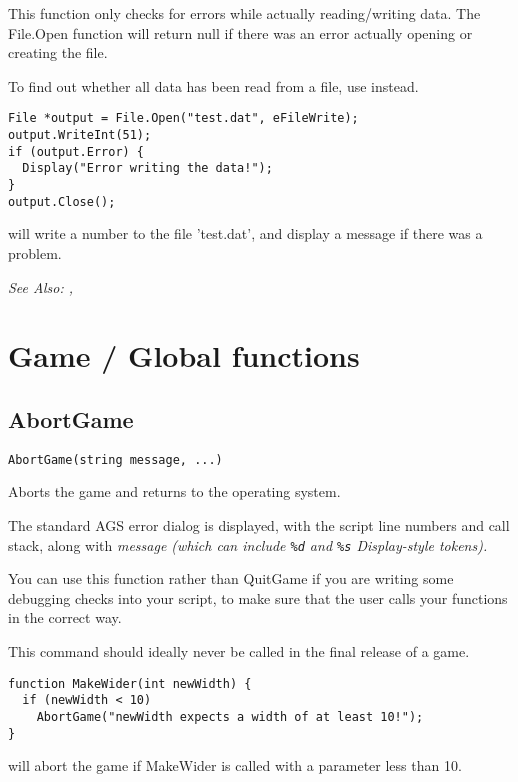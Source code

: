 This function only checks for errors while actually reading/writing data. The File.Open
function will return null if there was an error actually opening or creating the file.

To find out whether all data has been read from a file, use  instead.

\begin{verbatim}
File *output = File.Open("test.dat", eFileWrite);
output.WriteInt(51);
if (output.Error) {
  Display("Error writing the data!");
}
output.Close();
\end{verbatim}
will write a number to the file 'test.dat', and display a message if there was a problem.

\it{See Also:} , 



\section{Game / Global functions}\label{GlobalCommands}%



\subsection{AbortGame}\label{AbortGame}%

\begin{verbatim}
AbortGame(string message, ...)
\end{verbatim}
Aborts the game and returns to the operating system.

The standard AGS error dialog is displayed, with the script line numbers and call stack,
along with \it{message} (which can include \verb$%d$ and \verb$%s$ Display-style tokens).

You can use this function rather than QuitGame if you are writing some debugging checks
into your script, to make sure that the user calls your functions in the correct way.

This command should ideally never be called in the final release of a game.

\begin{verbatim}
function MakeWider(int newWidth) {
  if (newWidth < 10)
    AbortGame("newWidth expects a width of at least 10!");
}
\end{verbatim}
will abort the game if MakeWider is called with a parameter less than 10.

